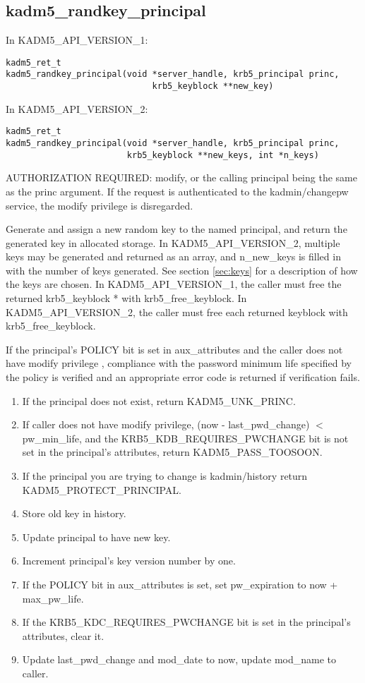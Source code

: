 \subsection{kadm5_randkey_principal}

In KADM5_API_VERSION_1:

\begin{verbatim}
kadm5_ret_t
kadm5_randkey_principal(void *server_handle, krb5_principal princ,
                             krb5_keyblock **new_key)
\end{verbatim}

In KADM5_API_VERSION_2:

\begin{verbatim}
kadm5_ret_t
kadm5_randkey_principal(void *server_handle, krb5_principal princ,
                        krb5_keyblock **new_keys, int *n_keys)
\end{verbatim}

AUTHORIZATION REQUIRED: modify, or the calling principal being the
same as the princ argument.  If the request is authenticated to the
kadmin/changepw service, the modify privilege is disregarded.

Generate and assign a new random key to the named principal, and
return the generated key in allocated storage.  In
KADM5_API_VERSION_2, multiple keys may be generated and returned as an
array, and n_new_keys is filled in with the number of keys generated.
See section \ref{sec:keys} for a description of how the keys are
chosen.  In KADM5_API_VERSION_1, the caller must free the returned
krb5_keyblock * with krb5_free_keyblock.  In KADM5_API_VERSION_2, the
caller must free each returned keyblock with krb5_free_keyblock.

If the principal's POLICY bit is set in aux_attributes and the caller does
not have modify privilege , compliance with the password minimum life
specified by the policy is verified and an appropriate error code is returned
if verification fails. 

\begin{enumerate}
\item If the principal does not exist, return KADM5_UNK_PRINC.
\item If caller does not have modify privilege, (now - last_pwd_change) $<$
pw_min_life, and the KRB5_KDB_REQUIRES_PWCHANGE bit is not set in the
principal's attributes, return KADM5_PASS_TOOSOON.
\item If the principal you are trying to change is kadmin/history return
KADM5_PROTECT_PRINCIPAL.
\item Store old key in history.
\item Update principal to have new key.
\item Increment principal's key version number by one.
\item If the POLICY bit in aux_attributes is set, set pw_expiration to
now + max_pw_life.
\item If the KRB5_KDC_REQUIRES_PWCHANGE bit is set in the principal's
attributes, clear it.
\item Update last_pwd_change and mod_date to now, update mod_name to
caller.
\end{enumerate}

